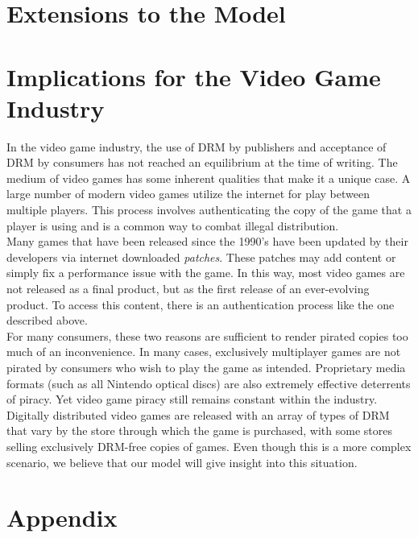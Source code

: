 \documentclass[a4paper,12pt]{article}
\numberwithin{equation}{section}
\begin{document}
\section{Extensions to the Model} \label{Sec:Extensions}

\section{Implications for the Video Game Industry}

In the video game industry, the use of DRM by publishers and acceptance of DRM by consumers has not reached an equilibrium at the time of writing. The medium of video games has some inherent qualities that make it a unique case. A large number of modern video games utilize the internet for play between multiple players. This process involves authenticating the copy of the game that a player is using and is a common way to combat illegal distribution.\\

Many games that have been released since the 1990's have been updated by their developers via internet downloaded \textit{patches}. These patches may add content or simply fix a performance issue with the game. In this way, most video games are not released as a final product, but as the first release of an ever-evolving product. To access this content, there is an authentication process like the one described above.\\

For many consumers, these two reasons are sufficient to render pirated copies too much of an inconvenience. In many cases, exclusively multiplayer games are not pirated by consumers who wish to play the game as intended. Proprietary media formats (such as all Nintendo optical discs) are also extremely effective deterrents of piracy. Yet video game piracy still remains constant within the industry.\\

Digitally distributed video games are released with an array of types of DRM that vary by the store through which the game is purchased, with some stores selling exclusively DRM-free copies of games. Even though this is a more complex scenario, we believe that our model will give insight into this situation.

\pagebreak




\pagebreak

\section{Appendix}
\end{document}

